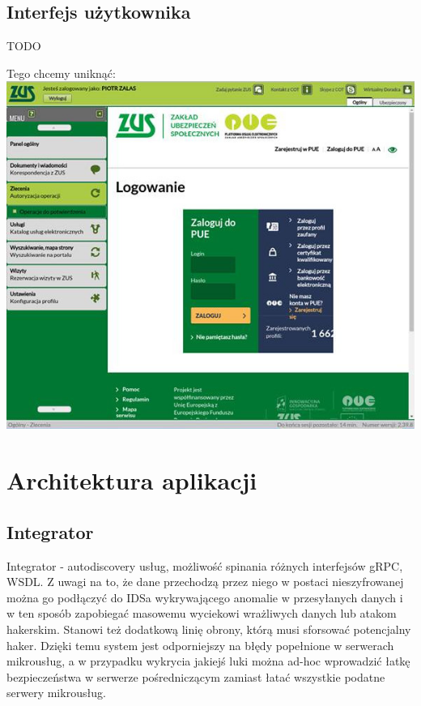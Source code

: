 \documentclass[licencjacka]{pracamgr}
\begin{document}
\section{Interfejs użytkownika}
TODO

Tego chcemy uniknąć:\\
\includegraphics[width=\textwidth]{obrazki/logowaniezle.jpg}

\chapter{Architektura aplikacji}

\section{Integrator}
Integrator - autodiscovery usług, możliwość spinania różnych interfejsów gRPC, WSDL. 
Z uwagi na to, że dane przechodzą przez niego w postaci nieszyfrowanej można
go podłączyć do IDSa wykrywającego anomalie w przesyłanych danych i w ten sposób
zapobiegać masowemu wyciekowi wrażliwych danych lub atakom hakerskim. Stanowi też
dodatkową linię obrony, którą musi sforsować potencjalny haker. Dzięki temu system jest
odporniejszy na błędy popełnione w serwerach mikrousług, a w przypadku wykrycia
jakiejś luki można ad-hoc wprowadzić łatkę bezpieczeństwa w serwerze pośredniczącym
zamiast łatać wszystkie podatne serwery mikrousług.
\end{document}
